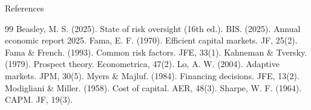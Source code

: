 \documentclass[aspectratio=169,10pt]{beamer}
\begin{document}
	\begin{frame}{References}
		\tiny
		\begin{thebibliography}{99}
			 Beasley, M. S. (2025). State of risk oversight (16th ed.).
			 BIS. (2025). Annual economic report 2025.
			 Fama, E. F. (1970). Efficient capital markets. JF, 25(2).
			 Fama \& French. (1993). Common risk factors. JFE, 33(1).
			 Kahneman \& Tversky. (1979). Prospect theory. Econometrica, 47(2).
			 Lo, A. W. (2004). Adaptive markets. JPM, 30(5).
			 Myers \& Majluf. (1984). Financing decisions. JFE, 13(2).
			 Modigliani \& Miller. (1958). Cost of capital. AER, 48(3).
			 Sharpe, W. F. (1964). CAPM. JF, 19(3).
		\end{thebibliography}
	\end{frame}
	
\end{document}
